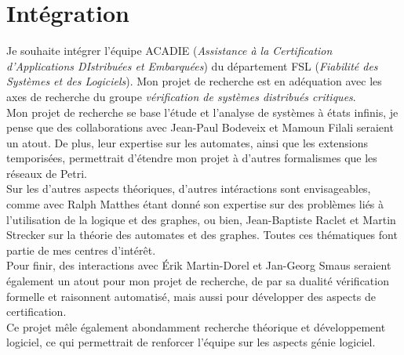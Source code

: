




\vspace{10pt}
\section*{Intégration}
\vspace{10pt}

Je souhaite intégrer l'équipe ACADIE (\emph{Assistance à la Certification
d’Applications DIstribuées et Embarquées}) du département FSL (\emph{Fiabilité
des Systèmes et des Logiciels}). Mon projet de recherche est en adéquation avec
les axes de recherche du groupe \emph{vérification de systèmes distribués
critiques}.\\

Mon projet de recherche se base l'étude et l'analyse de systèmes à états
infinis, je pense que des collaborations avec Jean-Paul Bodeveix et Mamoun
Filali seraient un atout. De plus, leur expertise sur les automates, ainsi que
les extensions temporisées, permettrait d'étendre mon projet à d'autres
formalismes que les réseaux de Petri.\\

Sur les d'autres aspects théoriques, d'autres intéractions sont envisageables, comme
avec Ralph Matthes étant donné son expertise sur des problèmes liés à
l'utilisation de la logique et des graphes, ou bien, Jean-Baptiste Raclet et
Martin Strecker sur la théorie des automates et des graphes. Toutes
ces thématiques font partie de mes centres d'intérêt.\\

Pour finir, des interactions avec Érik Martin-Dorel et Jan-Georg Smaus seraient
également un atout pour mon projet de recherche, de par sa dualité vérification
formelle et raisonnent automatisé, mais aussi pour développer des aspects de
certification.\\

Ce projet mêle également abondamment recherche théorique et développement
logiciel, ce qui permettrait de renforcer l'équipe sur les aspects génie
logiciel.\\



